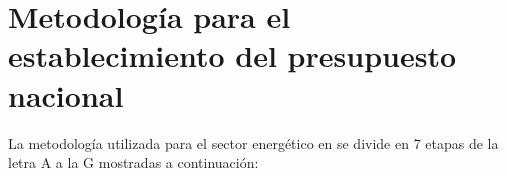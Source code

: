 







\section{Metodología para el establecimiento del presupuesto nacional}
\label{metodologiaAG}
La metodología utilizada para el sector energético en  se divide en 7 etapas de la letra A a la G mostradas a continuación:

